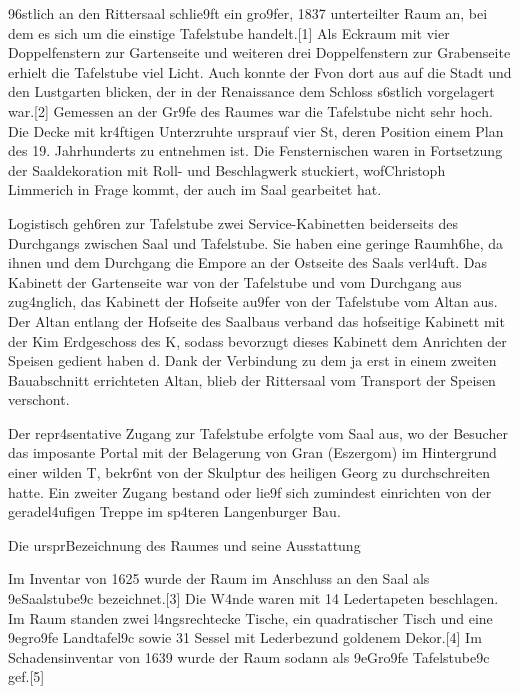 \documentclass[
  letterpaper,
]{book}
\begin{document}
\x96stlich an den Rittersaal schlie\x9ft ein gro\x9fer, 1837
unterteilter Raum an, bei dem es sich um die einstige Tafelstube
handelt.{[}1{]} Als Eckraum mit vier Doppelfenstern zur Gartenseite und
weiteren drei Doppelfenstern zur Grabenseite erhielt die Tafelstube viel
Licht. Auch konnte der F\xbcrst von dort aus auf die Stadt und den
Lustgarten blicken, der in der Renaissance dem Schloss
s\xbcd{}\xb6stlich vorgelagert war.{[}2{]} Gemessen an der
Gr\x9fe des Raumes war die Tafelstube nicht sehr hoch. Die
Decke mit kr\xa4ftigen Unterz\xbcgen ruhte
urspr\xbcnglich auf vier St\xbctzen, deren Position einem Plan
des 19. Jahrhunderts zu entnehmen ist. Die Fensternischen waren in
Fortsetzung der Saaldekoration mit Roll- und Beschlagwerk stuckiert,
wof\xbcr Christoph Limmerich in Frage kommt, der auch im Saal
gearbeitet hat.

Logistisch geh\xb6ren zur Tafelstube zwei Service-Kabinetten
beiderseits des Durchgangs zwischen Saal und Tafelstube. Sie haben eine
geringe Raumh\xb6he, da \xbcber ihnen und dem Durchgang die
Empore an der Ostseite des Saals verl\xa4uft. Das Kabinett der
Gartenseite war von der Tafelstube und vom Durchgang aus
zug\xa4nglich, das Kabinett der Hofseite au\x9fer von der
Tafelstube vom Altan aus. Der Altan entlang der Hofseite des Saalbaus
verband das hofseitige Kabinett mit der K\xbcche im Erdgeschoss des
K\xbcchenbaus, sodass bevorzugt dieses Kabinett dem Anrichten der
Speisen gedient haben d\xbcrfte. Dank der Verbindung zu dem ja erst
in einem zweiten Bauabschnitt errichteten Altan, blieb der Rittersaal
vom Transport der Speisen verschont.

Der repr\xa4sentative Zugang zur Tafelstube erfolgte vom Saal aus,
wo der Besucher das imposante Portal mit der Belagerung von Gran
(Eszergom) im Hintergrund einer wilden T\xbcrkenschlacht,
bekr\xb6nt von der Skulptur des heiligen Georg zu durchschreiten
hatte. Ein zweiter Zugang bestand oder lie\x9f sich zumindest
einrichten von der geradel\xa4ufigen Treppe im sp\xa4teren
Langenburger Bau.

Die urspr\xbcngliche Bezeichnung des Raumes und seine Ausstattung

Im Inventar von 1625 wurde der Raum im Anschluss an den
Saal als \x9eSaalstube\x9c bezeichnet.{[}3{]} Die
W\xa4nde waren mit 14 Ledertapeten beschlagen. Im Raum standen zwei
l\xa4ngsrechtecke Tische, ein quadratischer Tisch und eine
\x9egro\x9fe Landtafel\x9c sowie 31 Sessel mit
Lederbez\xbcgen und goldenem Dekor.{[}4{]} Im Schadensinventar von
1639 wurde der Raum sodann als \x9eGro\x9fe
Tafelstube\x9c gef\xbchrt.{[}5{]}
\end{document}
